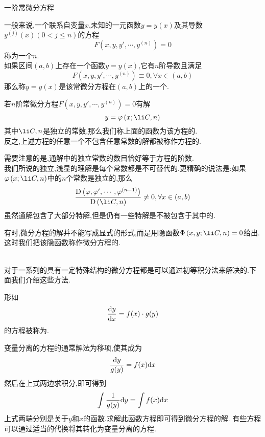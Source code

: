 \documentclass{ctexart}
\begin{document}
\pagestyle{empty}
\begin{center}\large 一阶常微分方程\end{center}
\begin{definition}[1.1 定义:常微分方程]
    一般来说,一个联系自变量$x$,未知的一元函数$y=y(x)$及其导数$y^{(j)}(x)(0<j\leqslant n)$的方程
    \[F\left(x,y,y',\cdots,y^{(n)}\right)=0\]
    称为一个$n$.\\
    如果区间$(a,b)$上存在一个函数$y=y(x)$,它有$n$阶导数且满足
    \[F\left(x,y,y',\cdots,y^{(n)}\right)\equiv0,\forall x\in(a,b)\]
    那么称$y=y(x)$是该常微分方程在$(a,b)$上的一个.
\end{definition}
\begin{definition}[1.2 定义:通解与特解]
    若$n$阶常微分方程$F\left(x,y,y',\cdots,y^{(n)}\right)=0$有解
    \[y=\varphi\left(x;\li C,n\right)\]
    其中$\li C,n$是独立的常数,那么我们称上面的函数为该方程的.\\
    反之,上述方程的任意一个不包含任意常数的解都被称作方程的.
\end{definition}\noindent
需要注意的是,通解中的独立常数的数目恰好等于方程的阶数.\\
我们所说的独立,浅显的理解是每个常数都是不可替代的.更精确的说法是:如果$\varphi\left(x;\li C,n\right)$中的$n$个常数是独立的,那么
\[\dfrac{\text{D}\left(\varphi,\varphi',\cdots,\varphi^{(n-1)}\right)}{\text{D}\left(\li C,n\right)}\neq0,\forall x\in (a,b)\]
虽然通解包含了大部分特解,但是仍有一些特解是不被包含于其中的.
\begin{definition}[1.3 定义:通积分]
    有时,微分方程的解并不能写成显式的形式,而是用隐函数$\Phi\left(x,y;\li C,n\right)=0$给出.这时我们把该隐函数称作微分方程的.
\end{definition}\noindent
{}\\
对于一系列的具有一定特殊结构的微分方程都是可以通过初等积分法来解决的.下面我们介绍这些方法.
\begin{definition}[2.1 变量分离的方程]
    形如
    \[\dfrac{\mathrm{d} y}{\mathrm{d} x}=f(x)\cdot g(y)\]
    的方程被称为.
\end{definition}
变量分离的方程的通常解法为移项,使其成为
\[\dfrac{\mathrm{d} y}{g(y)}=f(x)\mathrm{d} x\]
然后在上式两边求积分,即可得到
\[\int\dfrac{1}{g(y)}\mathrm{d} y=\int{f(x)\mathrm{d}x}\]
上式两端分别是关于$y$和$x$的函数.求解此函数方程即可得到微分方程的解.
有些方程可以通过适当的代换将其转化为变量分离的方程.
\end{document}
